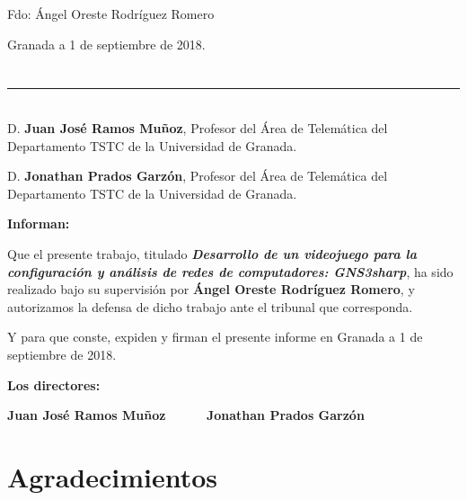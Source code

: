 \vspace{6cm}

\noindent Fdo: Ángel Oreste Rodríguez Romero

\vspace{2cm}

\begin{flushright}
Granada a 1 de septiembre de 2018.
\end{flushright}


\chapter*{}
\thispagestyle{empty}

\noindent\rule[-1ex]{\textwidth}{2pt}\\[4.5ex]

D. \textbf{Juan José Ramos Muñoz}, Profesor del Área de Telemática del Departamento TSTC de la Universidad de Granada.

\vspace{0.5cm}

D. \textbf{Jonathan Prados Garzón}, Profesor del Área de Telemática del Departamento TSTC de la Universidad de Granada.


\vspace{0.5cm}

\textbf{Informan:}

\vspace{0.5cm}

Que el presente trabajo, titulado \textit{\textbf{Desarrollo de un videojuego para la configuración y análisis de redes de computadores: GNS3sharp}},
ha sido realizado bajo su supervisión por \textbf{Ángel Oreste Rodríguez Romero}, y autorizamos la defensa de dicho trabajo ante el tribunal
que corresponda.

\vspace{0.5cm}

Y para que conste, expiden y firman el presente informe en Granada a 1 de septiembre de 2018.

\vspace{1cm}

\textbf{Los directores:}

\vspace{5cm}

\noindent \textbf{Juan José Ramos Muñoz \ \ \ \ \ Jonathan Prados Garzón}

\chapter*{Agradecimientos}
\thispagestyle{empty}

